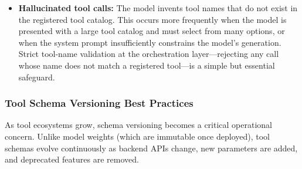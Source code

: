 \begin{itemize}
  \item \textbf{Hallucinated tool calls:} The model invents tool names that do not exist in the registered tool catalog. This occurs more frequently when the model is presented with a large tool catalog and must select from many options, or when the system prompt insufficiently constrains the model's generation. Strict tool-name validation at the orchestration layer---rejecting any call whose name does not match a registered tool---is a simple but essential safeguard.
\end{itemize}


\subsubsection{Tool Schema Versioning Best Practices}

As tool ecosystems grow, schema versioning becomes a critical operational concern. Unlike model weights (which are immutable once deployed), tool schemas evolve continuously as backend APIs change, new parameters are added, and deprecated features are removed.

